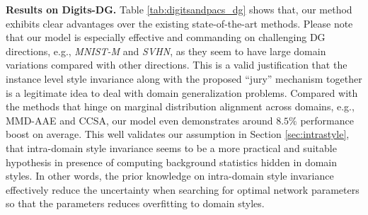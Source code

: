 \documentclass[10pt,twocolumn,letterpaper]{article}
\newcommand{\0}{{\bf 0}}
\begin{document}
\textbf{Results on Digits-DG.} Table \ref{tab:digitsandpacs_dg} shows that, our method exhibits clear advantages over the existing state-of-the-art methods. Please note that our model is especially effective and commanding on challenging DG directions, e.g., \textit{MNIST-M} and \textit{SVHN}, as they seem to have large domain variations compared with other directions. This is a valid justification that the instance level style invariance along with the proposed ``jury'' mechanism together is a legitimate idea to deal with domain generalization problems. Compared with the methods that hinge on marginal distribution alignment across domains, e.g., MMD-AAE and CCSA, our model even demonstrates around $8.5\%$ performance boost on average. This well validates our assumption in Section \ref{sec:intrastyle}, that intra-domain style invariance seems to be a more practical and suitable hypothesis in presence of computing background statistics hidden in domain styles. In other words, the prior knowledge on intra-domain style invariance effectively reduce the uncertainty when searching for optimal network parameters so that the parameters reduces overfitting to domain styles.
\end{document}
